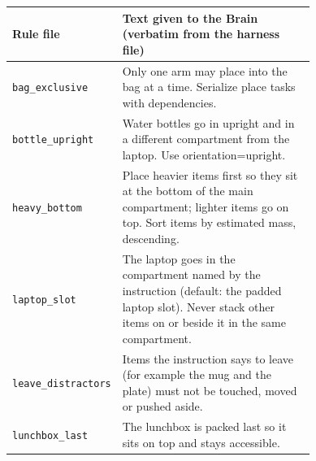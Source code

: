 \begin{tabular}{lp{0.74\linewidth}}
\toprule
Rule file & Text given to the Brain (verbatim from the harness file) \\
\midrule
\texttt{bag\_exclusive} & Only one arm may place into the bag at a time. Serialize place tasks with dependencies. \\
\texttt{bottle\_upright} & Water bottles go in upright and in a different compartment from the laptop. Use orientation=upright. \\
\texttt{heavy\_bottom} & Place heavier items first so they sit at the bottom of the main compartment; lighter items go on top. Sort items by estimated mass, descending. \\
\texttt{laptop\_slot} & The laptop goes in the compartment named by the instruction (default: the padded laptop slot). Never stack other items on or beside it in the same compartment. \\
\texttt{leave\_distractors} & Items the instruction says to leave (for example the mug and the plate) must not be touched, moved or pushed aside. \\
\texttt{lunchbox\_last} & The lunchbox is packed last so it sits on top and stays accessible. \\
\bottomrule
\end{tabular}
